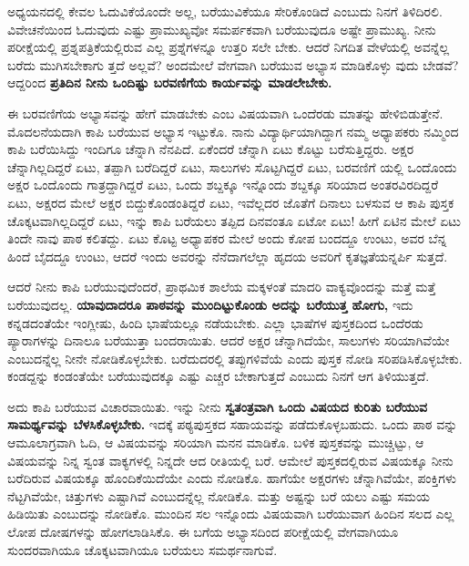 ಅಧ್ಯಯನದಲ್ಲಿ ಕೇವಲ ಓದುವಿಕೆಯೊಂದೇ ಅಲ್ಲ, ಬರೆಯುವಿಕೆಯೂ ಸೇರಿಕೊಂಡಿದೆ ಎಂಬುದು ನಿನಗೆ ತಿಳಿದಿರಲಿ. ವಿವೇಚನೆಯಿಂದ ಓದುವುದು ಎಷ್ಟು ಪ್ರಾಮುಖ್ಯವೋ ಸಮರ್ಪಕವಾಗಿ ಬರೆಯುವುದೂ ಅಷ್ಟೇ ಪ್ರಾಮುಖ್ಯ. ನೀನು ಪರೀಕ್ಷೆಯಲ್ಲಿ ಪ್ರಶ್ನಪತ್ರಿಕೆಯಲ್ಲಿರುವ ಎಲ್ಲ ಪ್ರಶ್ನೆಗಳನ್ನೂ ಉತ್ತರಿ ಸಲೇ ಬೇಕು. ಆದರೆ ನಿಗದಿತ ವೇಳೆಯಲ್ಲಿ ಅವನ್ನೆಲ್ಲ ಬರೆದು ಮುಗಿಸಬೇಕಾಗು ತ್ತದೆ ಅಲ್ಲವೆ? ಅಂದಮೇಲೆ ವೇಗವಾಗಿ ಬರೆಯುವ ಅಭ್ಯಾಸ ಮಾಡಿಕೊಳ್ಳು ವುದು ಬೇಡವೆ? ಆದ್ದರಿಂದ \textbf{ಪ್ರತಿದಿನ ನೀನು ಒಂದಿಷ್ಟು ಬರವಣಿಗೆಯ ಕಾರ್ಯವನ್ನು ಮಾಡಲೇಬೇಕು.}

ಈ ಬರವಣಿಗೆಯ ಅಭ್ಯಾಸವನ್ನು ಹೇಗೆ ಮಾಡಬೇಕು ಎಂಬ ವಿಷಯವಾಗಿ ಒಂದೆರಡು ಮಾತನ್ನು ಹೇಳಿಬಿಡುತ್ತೇನೆ. ಮೊದಲನೆಯದಾಗಿ ಕಾಪಿ ಬರೆಯುವ  ಅಭ್ಯಾಸ ಇಟ್ಟುಕೊ. ನಾನು ವಿದ್ಯಾರ್ಥಿಯಾಗಿದ್ದಾಗ ನಮ್ಮ ಅಧ್ಯಾಪಕರು ನಮ್ಮಿಂದ ಕಾಪಿ ಬರೆಯಿಸಿದ್ದು ಇಂದಿಗೂ ಚೆನ್ನಾಗಿ ನೆನಪಿದೆ. ಏಕೆಂದರೆ ಚೆನ್ನಾಗಿ ಏಟು ಕೊಟ್ಟು ಬರೆಸುತ್ತಿದ್ದರು. ಅಕ್ಷರ ಚೆನ್ನಾಗಿಲ್ಲದಿದ್ದರೆ ಏಟು, ತಪ್ಪಾಗಿ ಬರೆದಿದ್ದರೆ ಏಟು, ಸಾಲುಗಳು ಸೊಟ್ಟಗಿದ್ದರೆ ಏಟು, ಬರವಣಿಗೆ ಯಲ್ಲಿ ಒಂದೊಂದು ಅಕ್ಷರ ಒಂದೊಂದು ಗಾತ್ರದ್ದಾಗಿದ್ದರೆ ಏಟು, ಒಂದು ಶಬ್ದಕ್ಕೂ ಇನ್ನೊಂದು ಶಬ್ದಕ್ಕೂ ಸರಿಯಾದ ಅಂತರವಿರದಿದ್ದರೆ ಏಟು, ಅಕ್ಷರದ ಮೇಲೆ ಅಕ್ಷರ ಬಿದ್ದುಕೊಂಡಂತಿದ್ದರೆ ಏಟು, ಇವೆಲ್ಲದರ ಜೊತೆಗೆ ದಿನಾಲು ಬಳಸುವ ಆ ಕಾಪಿ ಪುಸ್ತಕ ಚೊಕ್ಕಟವಾಗಿಲ್ಲದಿದ್ದರೆ ಏಟು, ಇನ್ನು ಕಾಪಿ ಬರೆಯಲು ತಪ್ಪಿದ ದಿನವಂತೂ ಏಟೋ ಏಟು! ಹೀಗೆ ಏಟಿನ ಮೇಲೆ ಏಟು ತಿಂದೇ ನಾವು ಪಾಠ ಕಲಿತದ್ದು. ಏಟು ಕೊಟ್ಟ ಅಧ್ಯಾಪಕರ ಮೇಲೆ ಅಂದು ಕೋಪ ಬಂದದ್ದೂ ಉಂಟು, ಅವರ ಬೆನ್ನ ಹಿಂದೆ ಬೈದದ್ದೂ ಉಂಟು, ಆದರೆ ಇಂದು ಅವರನ್ನು ನೆನೆದಾಗಲೆಲ್ಲಾ ಹೃದಯ ಅವರಿಗೆ ಕೃತಜ್ಞತೆಯನ್ನರ್ಪಿ ಸುತ್ತದೆ.

ಆದರೆ ನೀನು ಕಾಪಿ ಬರೆಯುವುದೆಂದರೆ, ಪ್ರಾಥಮಿಕ ಶಾಲೆಯ ಮಕ್ಕಳಂತೆ ಮಾದರಿ ವಾಕ್ಯವೊಂದನ್ನು ಮತ್ತೆ ಮತ್ತೆ ಬರೆಯುವುದಲ್ಲ. \textbf{ಯಾವುದಾದರೂ ಪಾಠವನ್ನು ಮುಂದಿಟ್ಟುಕೊಂಡು ಅದನ್ನು ಬರೆಯುತ್ತ ಹೋಗು,} ಇದು ಕನ್ನಡದಂತೆಯೇ ಇಂಗ್ಲೀಷು, ಹಿಂದಿ ಭಾಷೆಯಲ್ಲೂ ನಡೆಯಬೇಕು. ಎಲ್ಲಾ ಭಾಷೆಗಳ ಪುಸ್ತಕದಿಂದ ಒಂದೆರಡು ಪ್ಯಾರಾಗಳನ್ನು ದಿನಾಲೂ ಬರೆಯುತ್ತಾ ಬಂದರಾಯಿತು. ಆದರೆ ಅಕ್ಷರ ಚೆನ್ನಾಗಿದೆಯೇ, ಸಾಲುಗಳು ಸರಿಯಾಗಿವೆಯೇ ಎಂಬುದನ್ನೆಲ್ಲ ನೀನೇ ನೋಡಿಕೊಳ್ಳಬೇಕು. ಬರೆದುದರಲ್ಲಿ ತಪ್ಪುಗಳಿವೆಯೆ ಎಂದು ಪುಸ್ತಕ ನೋಡಿ ಸರಿಪಡಿಸಿಕೊಳ್ಳಬೇಕು. ಕಂಡದ್ದನ್ನು ಕಂಡಂತೆಯೇ ಬರೆಯುವುದಕ್ಕೂ ಎಷ್ಟು ಎಚ್ಚರ ಬೇಕಾಗುತ್ತದೆ ಎಂಬುದು ನಿನಗೆ ಆಗ ತಿಳಿಯುತ್ತದೆ.

ಅದು ಕಾಪಿ ಬರೆಯುವ ವಿಚಾರವಾಯಿತು. ಇನ್ನು ನೀನು \textbf{ಸ್ವತಂತ್ರವಾಗಿ ಒಂದು ವಿಷಯದ ಕುರಿತು ಬರೆಯುವ ಸಾಮರ್ಥ್ಯವನ್ನು ಬೆಳಸಿಕೊಳ್ಳಬೇಕು.} ಇದಕ್ಕೆ ಪಠ್ಯಪುಸ್ತಕದ ಸಹಾಯವನ್ನು ಪಡೆದುಕೊಳ್ಳಬಹುದು. ಒಂದು ಪಾಠ ವನ್ನು ಆಮೂಲಾಗ್ರವಾಗಿ ಓದಿ, ಆ ವಿಷಯವನ್ನು ಸರಿಯಾಗಿ ಮನನ ಮಾಡಿಕೊ. ಬಳಿಕ ಪುಸ್ತಕವನ್ನು ಮುಚ್ಚಿಟ್ಟು, ಆ ವಿಷಯವನ್ನು ನಿನ್ನ ಸ್ವಂತ ವಾಕ್ಯಗಳಲ್ಲಿ ನಿನ್ನದೇ ಆದ ರೀತಿಯಲ್ಲಿ ಬರೆ. ಆಮೇಲೆ ಪುಸ್ತಕದಲ್ಲಿರುವ ವಿಷಯಕ್ಕೂ ನೀನು ಬರೆದಿರುವ ವಿಷಯಕ್ಕೂ ಹೊಂದಿಕೆಯಿದೆಯೇ ಎಂದು ನೋಡಿಕೊ. ಹಾಗೆಯೇ ಅಕ್ಷರಗಳು ಚೆನ್ನಾಗಿವೆಯೇ, ಪಂಕ್ತಿಗಳು ನೆಟ್ಟಗಿವೆಯೇ, ಚಿತ್ತುಗಳು ಎಷ್ಟಾಗಿವೆ ಎಂಬುದನ್ನೆಲ್ಲ ನೋಡಿಕೊ. ಮತ್ತು ಅಷ್ಟನ್ನು ಬರೆ ಯಲು ಎಷ್ಟು ಸಮಯ ಹಿಡಿಯಿತು ಎಂಬುದನ್ನು ನೋಡಿಕೊ. ಮುಂದಿನ ಸಲ ಇನ್ನೊಂದು ವಿಷಯವಾಗಿ ಬರೆಯುವಾಗ ಹಿಂದಿನ ಸಲದ ಎಲ್ಲ ಲೋಪ ದೋಷಗಳನ್ನು ಹೋಗಲಾಡಿಸಿಕೊ. ಈ ಬಗೆಯ ಅಭ್ಯಾಸದಿಂದ ಪರೀಕ್ಷೆಯಲ್ಲಿ ವೇಗವಾಗಿಯೂ ಸುಂದರವಾಗಿಯೂ ಚೊಕ್ಕಟವಾಗಿಯೂ ಬರೆಯಲು ಸಮರ್ಥನಾಗುವೆ.

